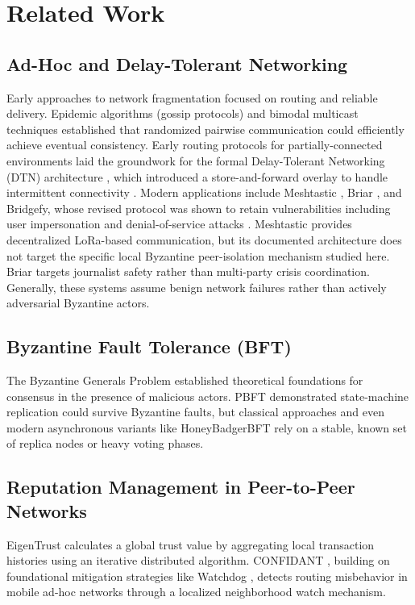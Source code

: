 \documentclass[conference]{IEEEtran}
\begin{document}
\section{Related Work}
\label{sec:related}

\subsection{Ad-Hoc and Delay-Tolerant Networking}
Early approaches to network fragmentation focused on routing and reliable delivery. Epidemic algorithms (gossip protocols) \cite{demers1987epidemic} and bimodal multicast techniques \cite{birman1999bimodal} established that randomized pairwise communication could efficiently achieve eventual consistency. Early routing protocols for partially-connected environments \cite{vahdat2000epidemic} laid the groundwork for the formal Delay-Tolerant Networking (DTN) architecture \cite{cerf2007dtn}, which introduced a store-and-forward overlay to handle intermittent connectivity \cite{khabbaz2012dtn}. Modern applications include Meshtastic \cite{meshtastic}, Briar \cite{briar}, and Bridgefy, whose revised protocol was shown to retain vulnerabilities including user impersonation and denial-of-service attacks \cite{albrecht2022bridgefy}. Meshtastic provides decentralized LoRa-based communication, but its documented architecture does not target the specific local Byzantine peer-isolation mechanism studied here. Briar targets journalist safety rather than multi-party crisis coordination. Generally, these systems assume benign network failures rather than actively adversarial Byzantine actors.

\subsection{Byzantine Fault Tolerance (BFT)}
The Byzantine Generals Problem \cite{lamport1982byzantine} established theoretical foundations for consensus in the presence of malicious actors. PBFT \cite{castro1999pbft} demonstrated state-machine replication could survive Byzantine faults, but classical approaches and even modern asynchronous variants like HoneyBadgerBFT \cite{miller2016honeybadger} rely on a stable, known set of replica nodes or heavy voting phases.

\subsection{Reputation Management in Peer-to-Peer Networks}
EigenTrust \cite{kamvar2003eigentrust} calculates a global trust value by aggregating local transaction histories using an iterative distributed algorithm. CONFIDANT \cite{buchegger2002confidant}, building on foundational mitigation strategies like Watchdog \cite{marti2000watchdog}, detects routing misbehavior in mobile ad-hoc networks through a localized neighborhood watch mechanism.
\end{document}
